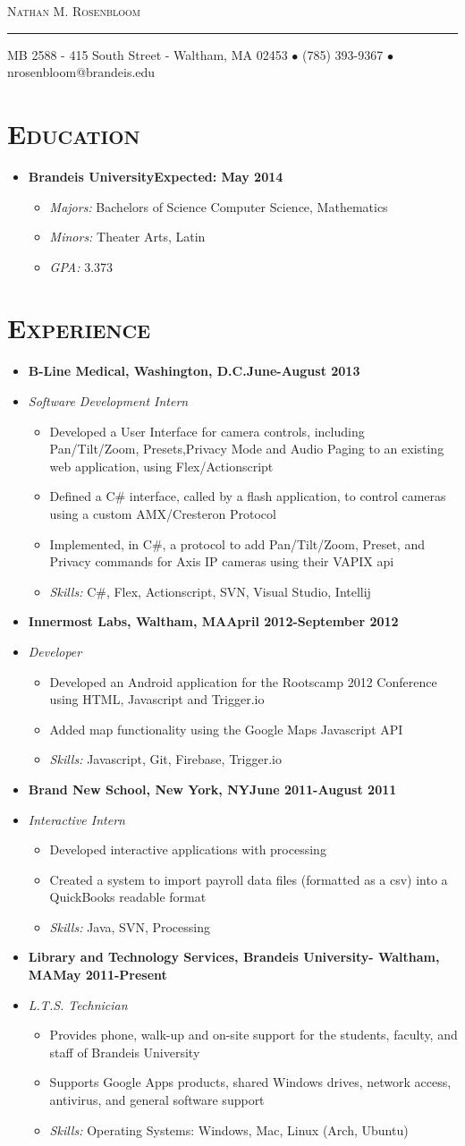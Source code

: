 \documentclass[11pt, oneside]{article}
\makeatletter
\newcommand{\lr}[2]{#1\hfill#2}
\newcommand{\name}{Nathan M. Rosenbloom}
\newcommand{\addr}{MB 2588 - 415 South Street - Waltham, MA 02453}
\newcommand{\phone}{(785) 393-9367}
\newcommand{\email}{nrosenbloom@brandeis.edu}
\newcommand{\resname}[4]{
  \begin{center}
    \selectfont\huge\scshape #1
    \normalfont
    \footnotesize
    \itshape
    \rule{\textwidth}{1pt}
    #2 $\bullet$ #3 $\bullet$ #4
    \normalfont
  \end{center}
}
\newcommand{\reseducation}[5]{
  \begin{ressection}{Education}
  \item[] \lr{\bfseries \selectfont #1\normalfont} {Expected: #2}
    \vspace{-8pt}
    \begin{itemize} \itemsep-2pt
      \item[] \textsl{Majors: }#4
      \item[] \textsl{Minors: }#5
      \item[] \textsl{GPA: }#3
    \end{itemize}
  \end{ressection}
}
\newcommand{\skills}[1]{
\item[] \textsl{Skills:} #1
}
\newenvironment{ressection}[1]{
  \section{\normalsize \scshape \selectfont #1 \normalfont}
  \vspace{-4pt}
  \begin{itemize} \itemsep-2pt
}{
  \end{itemize}
  \vspace{-20pt}
}
\newenvironment{resitem}[4]{
\item[] \lr{\bfseries \selectfont #1\normalfont, #2} {#3}
\item[] \textsl{#4}
  \vspace{-4pt}
  \begin{itemize} \itemsep-2pt
}{
  \end{itemize}
}
\makeatother
\begin{document}
\resname{\name}{\addr}{\phone}{\email}
\setcounter{secnumdepth}{-1} %
\reseducation{Brandeis University}{May 2014}{3.373}{Bachelors of Science Computer Science, Mathematics}{Theater Arts, Latin}
\begin{ressection}{Experience}
  \begin{resitem}{B-Line Medical}{Washington, D.C.}{June-August 2013}{Software Development Intern}
  \item Developed a User Interface for camera controls, including Pan/Tilt/Zoom, Presets,Privacy Mode and Audio Paging to an existing web application, using Flex/Actionscript
  \item Defined a C\# interface, called by a flash application, to control cameras using a custom AMX/Cresteron Protocol
  \item Implemented, in C\#, a protocol to add Pan/Tilt/Zoom, Preset, and Privacy commands for Axis IP cameras using their VAPIX api
    \skills{C\#, Flex, Actionscript, SVN, Visual Studio, Intellij}
  \end{resitem}
  \begin{resitem}{Innermost Labs}{Waltham, MA}{April 2012-September 2012}{Developer}
  \item Developed an Android application for the Rootscamp 2012 Conference using HTML, Javascript  and Trigger.io
  \item Added map functionality using the Google Maps Javascript API
    \skills{Javascript, Git, Firebase, Trigger.io}
  \end{resitem}
  \begin{resitem}{Brand New School}{New York, NY}{June 2011-August 2011}{Interactive Intern}
  \item Developed interactive applications with processing
  \item Created a system to import payroll data files (formatted as a csv) into a QuickBooks readable format
    \skills{Java, SVN, Processing}
  \end{resitem}
  \begin{resitem}{Library and Technology Services}{Brandeis University- Waltham, MA}{May 2011-Present}{L.T.S. Technician} 
  \item Provides phone, walk-up and on-site support for the students, faculty, and staff of Brandeis University
  \item Supports Google Apps products, shared Windows drives, network access, antivirus, and general software support 
    \skills{Operating Systems: Windows, Mac, Linux (Arch, Ubuntu)}
  \end{resitem}
\end{ressection}
\end{document}
